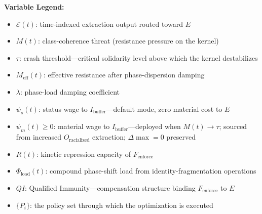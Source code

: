 \documentclass[12pt,openany]{book}
\begin{document}
\begin{definition}
\textbf{Variable Legend:}
\begin{itemize}[leftmargin=*, nosep]
    \item $\mathcal{E}(t)$: time-indexed extraction output routed toward $E$
    \item $M(t)$: class-coherence threat (resistance pressure on the kernel)
    \item $\tau$: crash threshold---critical solidarity level above which the kernel destabilizes
    \item $M_{\text{eff}}(t)$: effective resistance after phase-dispersion damping
    \item $\lambda$: phase-load damping coefficient
    \item $\psi_s(t)$: status wage to $I_{\text{buffer}}$---default mode, zero material cost to $E$
    \item $\psi_m(t) \geq 0$: material wage to $I_{\text{buffer}}$---deployed when $M(t) \to \tau$; sourced from increased $O_{\text{racialized}}$ extraction; $\Delta\max = 0$ preserved
    \item $R(t)$: kinetic repression capacity of $F_{\text{enforce}}$
    \item $\Phi_{\text{load}}(t)$: compound phase-shift load from identity-fragmentation operations
    \item $QI$: Qualified Immunity---compensation structure binding $F_{\text{enforce}}$ to $E$
    \item $\{P_i\}$: the policy set through which the optimization is executed
\end{itemize}
\end{definition}
\end{document}

